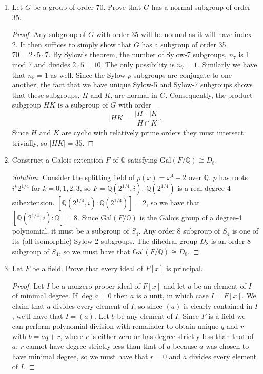 \documentclass[11pt,letterpaper]{report}
\newcommand{\rationals}{\mathbb{Q}}
\newcommand{\Gal}{\text{Gal}}
\newenvironment{solution}
{\begin{proof}[Solution]}
{\end{proof}}
\begin{document}
\begin{enumerate}
	\item Let $G$ be a group of order 70. Prove that $G$ has a normal subgroup of order 35.
	\begin{proof}
		Any subgroup of $G$ with order 35 will be normal as it will have index 2. It then suffices to simply show that $G$ has a subgroup of order 35.\\

		\noindent $70 = 2\cdot 5\cdot 7$. By Sylow's theorem, the number of Sylow-7 subgroups, $n_7$ is 1 mod 7 and divides $2\cdot 5 = 10$. The only possibility is $n_7 = 1$. Similarly we have that $n_5 = 1$ as well. Since the Sylow-$p$ subgroups are conjugate to one another, the fact that we have unique Sylow-5 and Sylow-7 subgroups shows that these subgroups, $H$ and $K$, are normal in $G$. Consequently, the product subgroup $HK$ is a subgroup of $G$ with order
		\[
		|HK| = \frac{|H|\cdot |K|}{|H\cap K|}.
		\]
		Since $H$ and $K$ are cyclic with relatively prime orders they must intersect trivially, so $|HK| = 35$.
	\end{proof}

	\item Construct a Galois extension $F$ of $\rationals$ satisfying $\Gal(F/\rationals)\cong D_8$.
	\begin{solution}
		Consider the splitting field of $p(x) = x^4-2$ over $\rationals$. $p$ has roots $i^k2^{1/4}$ for $k = 0, 1, 2, 3$, so $F = \rationals(2^{1/4}, i)$. $\rationals(2^{1/4})$ is a real degree 4 subextension. $[\rationals(2^{1/4}, i): \rationals(2^{1/4})]=2$, so we have that $[\rationals(2^{1/4}, i):\rationals] = 8$. Since $\Gal(F/\rationals)$ is the Galois group of a degree-4 polynomial, it must be a subgroup of $S_4$. Any order 8 subgroup of $S_4$ is one of its (all isomorphic) Sylow-2 subgroups. The dihedral group $D_8$ is an order 8 subgroup of $S_4$, so we must have that $\Gal(F/\rationals)\cong D_8$.
	\end{solution}

	\item Let $F$ be a field. Prove that every ideal of $F[x]$ is principal.
	\begin{proof}
		Let $I$ be a nonzero proper ideal of $F[x]$ and let $a$ be an element of $I$ of minimal degree. If $\deg a = 0$ then $a$ is a unit, in which case $I = F[x]$. We claim that $a$ divides every element of $I$, so since $(a)$ is clearly contained in $I$, we'll have that $I = (a)$. Let $b$ be any element of $I$. Since $F$ is a field we can perform polynomial division with remainder to obtain unique $q$ and $r$ with $b = aq+r$, where $r$ is either zero or has degree strictly less than that of $a$. $r$ cannot have degree strictly less than that of $a$ because $a$ was chosen to have minimal degree, so we must have that $r=0$ and $a$ divides every element of $I$.
	\end{proof}


\end{enumerate}
\end{document}
